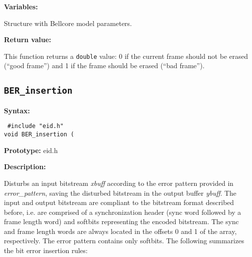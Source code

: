 {\bf Variables: }
\begin{Descr}{\DescrLen}
 \item[\pbox{20mm}{\em EID}] Structure with Bellcore model parameters.
\end{Descr}

{\bf Return value: }

This function returns a {\tt double} value: 0 if the current frame
should not be erased (``good frame'') and 1 if the frame should be
erased (``bad frame'').

\subsection{{\tt BER\_insertion}}

{\bf Syntax: }

{\tt
\#include "eid.h"\\
void BER\_insertion (
}

{\bf Prototype: }    eid.h

{\bf Description: }

Disturbs an input bitstream {\em xbuff} according to the error pattern
provided in {\em error\_pattern}, saving the disturbed bitstream in
the output buffer {\em ybuff}. The input and output bitstream are
compliant to the bitstream format described before, i.e. are comprised
of a synchronization header (sync word followed by a frame length
word) and softbits representing the encoded bitstream. The sync and
frame length words are always located in the offsets 0 and 1 of the
array, respectively. The error pattern contains only softbits. The
following summarizes the bit error insertion rules:

\def\labelenumi{\alph{enumi})}
\def\theenumi{\alph{enumi}}

